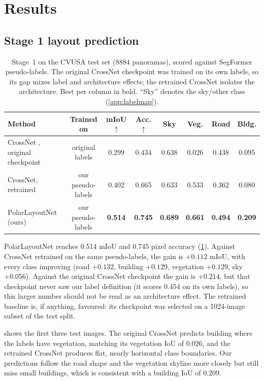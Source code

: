 \documentclass[11pt]{article}
\begin{document}
\section{Results}
\label{sec:results}

\subsection{Stage 1 layout prediction}
\label{sec:s1main}

\begin{table}[t]
  \centering
  \small
  \caption{Stage~1 on the CVUSA test set (\num{8884} panoramas), scored against SegFormer pseudo-labels. The
  original CrossNet checkpoint was trained on its own labels, so its gap mixes label and architecture effects;
  the retrained CrossNet isolates the architecture. Best per column in bold. ``Sky'' denotes the sky/other class
  (\cref{app:labelmap}).}
  \label{tab:stage1}
  \setlength{\tabcolsep}{5pt}
  \begin{tabular}{l c cc cccc}
    \toprule
    Method & Trained on & mIoU$\uparrow$ & Acc.$\uparrow$ & Sky & Veg. & Road & Bldg. \\
    \midrule
    CrossNet \cite{zhai2017crossnet}, original checkpoint & original labels & 0.299 & 0.434 & 0.638 & 0.026 & 0.438 & 0.095 \\
    CrossNet, retrained & our pseudo-labels & 0.402 & 0.665 & 0.633 & 0.533 & 0.362 & 0.080 \\
    PolarLayoutNet (ours) & our pseudo-labels & \textbf{0.514} & \textbf{0.745} & \textbf{0.689} & \textbf{0.661} & \textbf{0.494} & \textbf{0.209} \\
    \bottomrule
  \end{tabular}
\end{table}

PolarLayoutNet reaches 0.514 mIoU and 0.745 pixel accuracy (\cref{tab:stage1}). Against CrossNet retrained on
the same pseudo-labels, the gain is $+0.112$ mIoU, with every class improving (road $+0.132$, building
$+0.129$, vegetation $+0.129$, sky $+0.056$). Against the original CrossNet checkpoint the gain is $+0.214$,
but that checkpoint never saw our label definition (it scores 0.454 on its own labels), so this larger number
should not be read as an architecture effect. The retrained baseline is, if anything, favoured: its checkpoint
was selected on a \num{1024}-image subset of the test split.

 shows the first three test images. The original CrossNet predicts building where the
labels have vegetation, matching its vegetation IoU of 0.026, and the retrained CrossNet produces flat,
nearly horizontal class boundaries. Our predictions follow the road shape and the vegetation skyline more closely but still miss small
buildings, which is consistent with a building IoU of 0.209.
\end{document}
